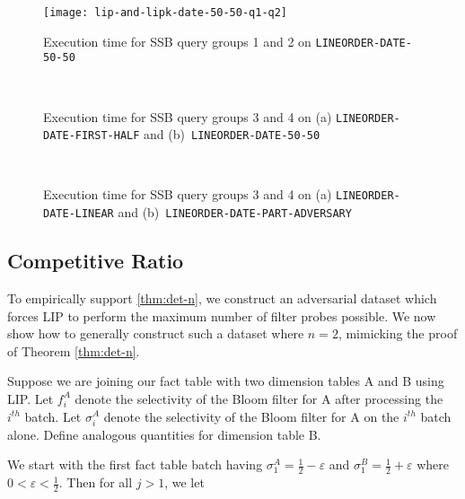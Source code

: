 \begin{figure}
    \centering
    \texttt{[image: lip-and-lipk-date-50-50-q1-q2]}
    \caption{Execution time for SSB query groups 1 and 2 on \texttt{LINEORDER-DATE-50-50}}
    \label{fig:times0}
\end{figure}

\begin{figure}
    \centering
    \\
    \caption{Execution time for SSB query groups 3 and 4 on (a) \texttt{LINEORDER-DATE-FIRST-HALF} and (b)~\texttt{LINEORDER-DATE-50-50}}
    \label{fig:times1}
\end{figure}


\begin{figure}
    \centering    
    \\
    \caption{Execution time for SSB query groups 3 and 4 on (a) \texttt{LINEORDER-DATE-LINEAR} and (b)~\texttt{LINEORDER-DATE-PART-ADVERSARY}}
    \label{fig:times2}
\end{figure}



\subsection{Competitive Ratio}
\label{sec:ratio}

To empirically support \ref{thm:det-n}, we construct an adversarial dataset which forces LIP to perform the maximum number of filter probes possible.
We now show how to generally construct such a dataset where $n = 2$, mimicking the proof of Theorem \ref{thm:det-n}.

Suppose we are joining our fact table with two dimension tables A and B using LIP.
Let $f_i^A$ denote the selectivity of the Bloom filter for A after processing the $i^{th}$ batch. 
Let $\sigma_i^A$ denote the selectivity of the Bloom filter for A on the $i^{th}$ batch alone. 
Define analogous quantities for dimension table B.

We start with the first fact table batch having
$\sigma_1^A = \frac{1}{2} - \varepsilon$ and $\sigma_1^B = \frac{1}{2} + \varepsilon$ where $0 < \varepsilon < \frac{1}{2}$. Then for all $j > 1$, we let

